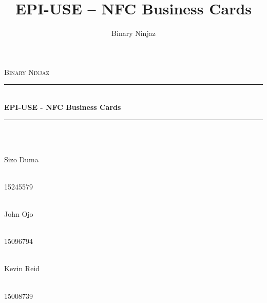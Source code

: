 \documentclass[11pt]{article}
\author{Binary Ninjaz}
\title{EPI-USE -- NFC Business Cards}
\begin{document}
\begin{titlepage}
	
	\begin{center}
       
		\textsc{\LARGE Binary Ninjaz}\\[0.3cm]
		\rule{\linewidth}{0.5mm} \\[1cm]
		{ \huge \bfseries EPI-USE - NFC Business Cards}\\[0.5cm]
		\rule{\linewidth}{0.5mm} \\[1cm] 		
  
		
		\begin{minipage}{0.4\textwidth}
			\begin{flushleft} \large
				\emph{} \\
				Sizo {Duma}
			\end{flushleft}
		\end{minipage}
		\begin{minipage}{0.4\textwidth}
			\begin{flushright} \large
				\emph{} \\
				15245579
			\end{flushright}
		\end{minipage}

		\begin{minipage}{0.4\textwidth}
			\begin{flushleft} \large
            	\emph{} \\
				John {Ojo}
			\end{flushleft}
		\end{minipage}
		\begin{minipage}{0.4\textwidth}
			\begin{flushright} \large
				\emph{} \\
				15096794 
			\end{flushright}
		\end{minipage}
		
		\begin{minipage}{0.4\textwidth}
			\begin{flushleft} \large
				\emph{} \\
				Kevin Reid
			\end{flushleft}
		\end{minipage}
		\begin{minipage}{0.4\textwidth}
			\begin{flushright} \large
				\emph{} \\
				15008739
			\end{flushright}
		\end{minipage}


\end{center}
\end{titlepage}
\end{document}
